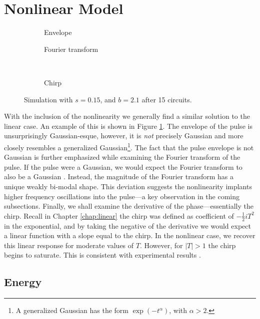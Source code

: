 \section{Nonlinear Model}
\begin{figure}[tbp]
\centering
\begin{subfigure}{0.5\textwidth}
\centering

\caption{Envelope}
\end{subfigure}%
\begin{subfigure}{0.5\textwidth}
\centering

\caption{Fourier transform}
\end{subfigure} \\
\begin{subfigure}{0.5\textwidth}
\centering

\caption{Chirp}
\end{subfigure}
\caption[Envelope, Fourier transform, and chirp of the pulse---stable case.]{Simulation with $s = 0.15$, and $b = 2.1$ after 15 circuits.}
\label{fig:nlstable}
\end{figure}
With the inclusion of the nonlinearity we generally find a similar solution to the linear case. An example of this is shown in Figure \ref{fig:nlstable}. The envelope of the pulse is unsurprisingly Gaussian-esque, however, it is \emph{not} precisely Gaussian and more closely resembles a generalized Gaussian\footnote{A generalized Gaussian has the form $\exp \left(-t^\alpha \right)$, with $\alpha > 2$.}. The fact that the pulse envelope is not Gaussian is further emphasized while examining the Fourier transform of the pulse. If the pulse were a Gaussian, we would expect the Fourier transform to also be a Gaussian \cite{debnath, gradshteyn}. Instead, the magnitude of the Fourier transform has a unique weakly bi-modal shape. This deviation suggests the nonlinearity implants higher frequency oscillations into the pulse---a key observation in the coming subsections. Finally, we shall examine the derivative of the phase---essentially the chirp. Recall in Chapter \ref{chap:linear} the chirp was defined as coefficient of $-\frac{1}{2}iT^2$ in the exponential, and by taking the negative of the derivative we would expect a linear function with a slope equal to the chirp. In the nonlinear case, we recover this linear response for moderate values of $T$. However, for $|T| > 1$ the chirp begins to saturate. This is consistent with experimental results \cite{chen, rothenberg, tomlinson}. \\

\subsection{Energy}
\label{chap:energy}

